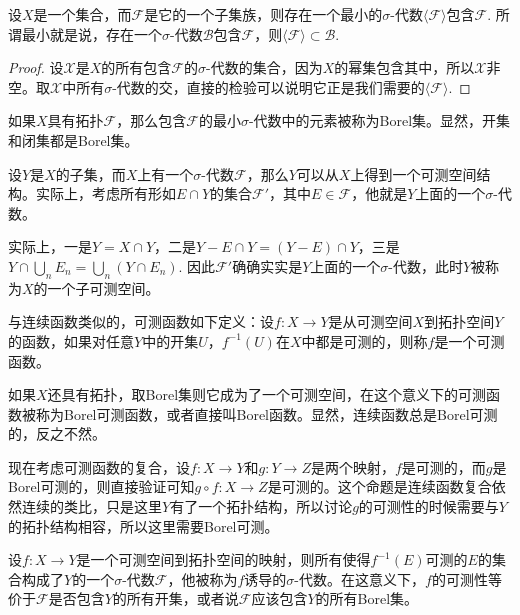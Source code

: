 \begin{pro}
设$X$是一个集合，而$\mathcal{F}$是它的一个子集族，则存在一个最小的$\sigma$-代数$\langle \mathcal{F}\rangle$包含$\mathcal{F}$. 所谓最小就是说，存在一个$\sigma$-代数$\mathcal{B}$包含$\mathcal{F}$，则$\langle \mathcal{F}\rangle\subset \mathcal{B}$.
\end{pro}

\begin{proof}
设$\mathscr{X}$是$X$的所有包含$\mathcal{F}$的$\sigma$-代数的集合，因为$X$的幂集包含其中，所以$\mathscr{X}$非空。取$\mathscr{X}$中所有$\sigma$-代数的交，直接的检验可以说明它正是我们需要的$\langle \mathcal{F}\rangle$.
\end{proof}

如果$X$具有拓扑$\mathcal{F}$，那么包含$\mathcal{F}$的最小$\sigma$-代数中的元素被称为Borel集。显然，开集和闭集都是Borel集。

\begin{para}
设$Y$是$X$的子集，而$X$上有一个$\sigma$-代数$\mathcal{F}$，那么$Y$可以从$X$上得到一个可测空间结构。实际上，考虑所有形如$E\cap Y$的集合$\mathcal{F}'$，其中$E\in \mathcal{F}$，他就是$Y$上面的一个$\sigma$-代数。

实际上，一是$Y=X\cap Y$，二是$Y-E\cap Y=(Y-E)\cap Y$，三是$Y\cap \bigcup_n E_n=\bigcup_n (Y\cap E_n)$. 因此$\mathcal{F}'$确确实实是$Y$上面的一个$\sigma$-代数，此时$Y$被称为$X$的一个子可测空间。
\end{para}

\begin{para}
与连续函数类似的，可测函数如下定义：设$f:X\to Y$是从可测空间$X$到拓扑空间$Y$的函数，如果对任意$Y$中的开集$U$，$f^{-1}(U)$在$X$中都是可测的，则称$f$是一个可测函数。

如果$X$还具有拓扑，取Borel集则它成为了一个可测空间，在这个意义下的可测函数被称为Borel可测函数，或者直接叫Borel函数。显然，连续函数总是Borel可测的，反之不然。

现在考虑可测函数的复合，设$f:X\to Y$和$g:Y\to Z$是两个映射，$f$是可测的，而$g$是Borel可测的，则直接验证可知$g\circ f:X\to Z$是可测的。这个命题是连续函数复合依然连续的类比，只是这里$Y$有了一个拓扑结构，所以讨论$g$的可测性的时候需要与$Y$的拓扑结构相容，所以这里需要Borel可测。
\end{para}

\begin{pro}
设$f:X\to Y$是一个可测空间到拓扑空间的映射，则所有使得$f^{-1}(E)$可测的$E$的集合构成了$Y$的一个$\sigma$-代数$\mathcal{F}$，他被称为$f$诱导的$\sigma$-代数。在这意义下，$f$的可测性等价于$\mathcal{F}$是否包含$Y$的所有开集，或者说$\mathcal{F}$应该包含$Y$的所有Borel集。
\end{pro}

